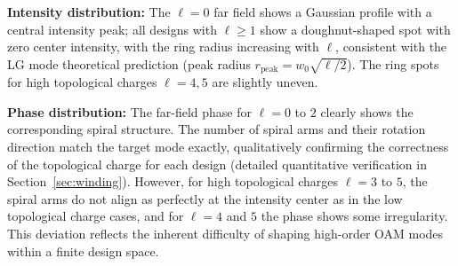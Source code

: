 \textbf{Intensity distribution:} The $\ell = 0$ far field shows a Gaussian profile with a central intensity peak; all designs with $\ell \geq 1$ show a doughnut-shaped spot with zero center intensity, with the ring radius increasing with $\ell$, consistent with the LG mode theoretical prediction (peak radius $r_\text{peak} = w_0\sqrt{\ell/2}$). The ring spots for high topological charges $\ell = 4, 5$ are slightly uneven.

\textbf{Phase distribution:} The far-field phase for $\ell = 0$ to $2$ clearly shows the corresponding spiral structure. The number of spiral arms and their rotation direction match the target mode exactly, qualitatively confirming the correctness of the topological charge for each design (detailed quantitative verification in Section~\ref{sec:winding}). However, for high topological charges $\ell = 3$ to $5$, the spiral arms do not align as perfectly at the intensity center as in the low topological charge cases, and for $\ell = 4$ and $5$ the phase shows some irregularity. This deviation reflects the inherent difficulty of shaping high-order OAM modes within a finite design space.

